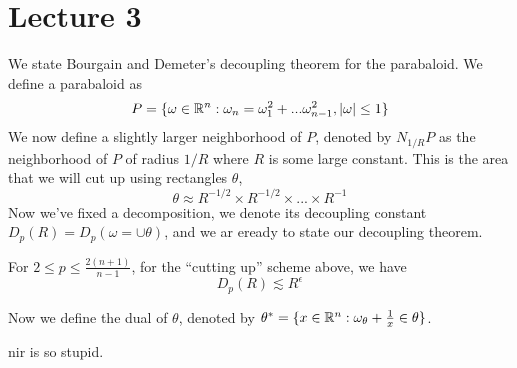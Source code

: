 \section*{Lecture 3}
We state Bourgain and Demeter's decoupling theorem for the parabaloid. We define a parabaloid as
\begin{equation*}
    P=\{\omega\in\mathbb{R}^n: \omega_n=\omega_1^2+...\omega_{n-1}^2, |\omega|\leq 1\}
\end{equation*}
We now define a slightly larger neighborhood of $P$, denoted by $N_{1/R}P$ as the neighborhood of $P$ of radius $1/R$ where $R$ is some large constant. This is the area that we will cut up using rectangles $\theta$,
\begin{equation*}
    \theta\approx R^{-1/2}\times R^{-1/2}\times...\times R^{-1}
\end{equation*}
Now we've fixed a decomposition, we denote its decoupling constant $D_p(R)=D_p(\omega=\cup\theta)$, and we ar eready to state our decoupling theorem.

\begin{theorem}
    For $2\leq p\leq\frac{2(n+1)}{n-1}$, for the ``cutting up'' scheme above, we have
    \begin{equation*}
        D_p(R)\lesssim R^{\epsilon}
    \end{equation*}
\end{theorem}

Now we define the dual of $\theta$, denoted by $\theta^*=\{x\in\mathbb{R}^n: \omega_\theta+\frac{1}{x}\in\theta\}$.  

nir is so stupid.
